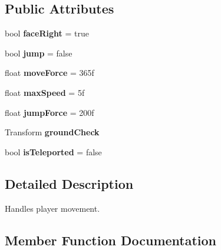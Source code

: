 \subsection*{Public Attributes}
\begin{DoxyCompactItemize}
\item 
\mbox{\label{class_player_movement_aa83a2390fe399c816eac24ac74a02528}} 
bool {\bfseries face\+Right} = true
\item 
\mbox{\label{class_player_movement_aaf3e5c59c7392a57747a6a189c29febe}} 
bool {\bfseries jump} = false
\item 
\mbox{\label{class_player_movement_a411dc41a76270f4ff0ea15e0b996b8ed}} 
float {\bfseries move\+Force} = 365f
\item 
\mbox{\label{class_player_movement_a18b9bde59ef4f50acf685694f67ee3c7}} 
float {\bfseries max\+Speed} = 5f
\item 
\mbox{\label{class_player_movement_a2918af247f8fd93a1dfe84b8d997c280}} 
float {\bfseries jump\+Force} = 200f
\item 
\mbox{\label{class_player_movement_a681e7b28ce40d859bbe21c231a676ce8}} 
Transform {\bfseries ground\+Check}
\item 
\mbox{\label{class_player_movement_a48a8923fa5137614141dd6886257af61}} 
bool {\bfseries is\+Teleported} = false
\end{DoxyCompactItemize}


\subsection{Detailed Description}
Handles player movement. 

\subsection{Member Function Documentation}
\mbox{\label{class_player_movement_aea65f5f7247feb09772da2543c8ec427}} 
